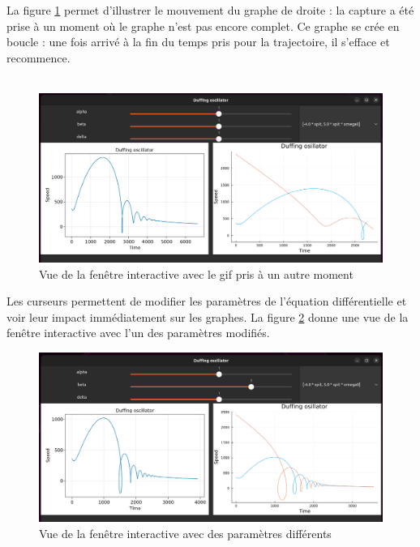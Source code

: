 \documentclass[a4paper, french, 12pt, titlepage]{article}
\begin{document}
La figure \ref{fig:fig3} permet d'illustrer le mouvement du graphe de droite : la capture a été prise à un moment où le graphe n'est pas encore complet. Ce graphe se crée en boucle : une fois arrivé à la fin du temps pris pour la trajectoire, il s'efface et recommence. \\
\\

\begin{figure}[htb]
  \includegraphics[width=\linewidth]{interactivewindow_2.png}
  \caption{Vue de la fenêtre interactive avec le gif pris à un autre moment}
  \label{fig:fig3}
\end{figure}


Les curseurs permettent de modifier les paramètres de l'équation différentielle et voir leur impact immédiatement sur les graphes. La figure \ref{fig:fig4} donne une vue de la fenêtre interactive avec l'un des paramètres modifiés. \\


\begin{figure}[H]
  \includegraphics[width=\linewidth]{interactivewindow_3.png}
  \caption{Vue de la fenêtre interactive avec des paramètres différents}
  \label{fig:fig4}
\end{figure}
\end{document}
